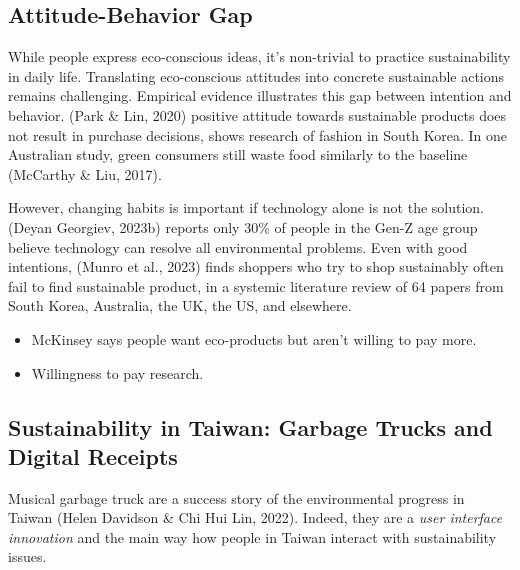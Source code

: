 \documentclass[
  12pt,
  letterpaper,
  DIV=11,
  numbers=noendperiod]{scrartcl}
\begin{document}
\subsection{Attitude-Behavior Gap}\label{attitude-behavior-gap}

While people express eco-conscious ideas, it's non-trivial to practice
sustainability in daily life. Translating eco-conscious attitudes into
concrete sustainable actions remains challenging. Empirical evidence
illustrates this gap between intention and behavior. (Park \& Lin, 2020)
positive attitude towards sustainable products does not result in
purchase decisions, shows research of fashion in South Korea. In one
Australian study, green consumers still waste food similarly to the
baseline (McCarthy \& Liu, 2017).

However, changing habits is important if technology alone is not the
solution. (Deyan Georgiev, 2023b) reports only 30\% of people in the
Gen-Z age group believe technology can resolve all environmental
problems. Even with good intentions, (Munro et al., 2023) finds shoppers
who try to shop sustainably often fail to find sustainable product, in a
systemic literature review of 64 papers from South Korea, Australia, the
UK, the US, and elsewhere.

\begin{itemize}
\item
  McKinsey says people want eco-products but aren't willing to pay more.
\item
  Willingness to pay research.
\end{itemize}

\subsection{Sustainability in Taiwan: Garbage Trucks and Digital
Receipts}\label{sustainability-in-taiwan-garbage-trucks-and-digital-receipts}

Musical garbage truck are a success story of the environmental progress
in Taiwan (Helen Davidson \& Chi Hui Lin, 2022). Indeed, they are a
\emph{user interface innovation} and the main way how people in Taiwan
interact with sustainability issues.
\end{document}
